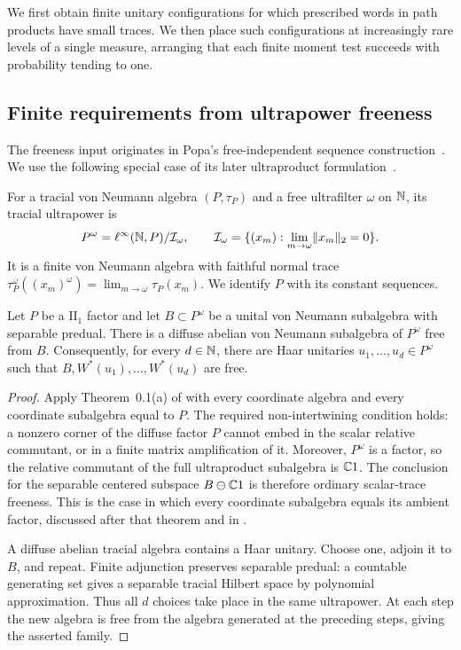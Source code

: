 We first obtain finite unitary configurations for which prescribed
words in path products have small traces.  We then place such
configurations at increasingly rare levels of a single measure,
arranging that each finite moment test succeeds with probability
tending to one.

\subsection{Finite requirements from ultrapower freeness}

The freeness input originates in Popa's free-independent sequence
construction~\cite[Lemma~1.4 and Theorem~2.1]{Popa1995}.
We use the following special case of its later ultraproduct
formulation~\cite[Theorem~0.1(a)]{Popa2014}.

For a tracial von Neumann algebra $(P,\tau_P)$ and a free ultrafilter
$\omega$ on $\mathbb N$, its tracial ultrapower is
\begin{equation}\label{eq:tracial-ultrapower}
 P^\omega=\ell^\infty(\mathbb N,P)/\mathcal I_\omega,
 \qquad
 \mathcal I_\omega
 =\{(x_m):\lim_{m\to\omega}\lVert x_m\rVert_2=0\}.
\end{equation}
It is a finite von Neumann algebra with faithful normal trace
$\tau_P^\omega((x_m)^\omega)=\lim_{m\to\omega}\tau_P(x_m)$.
We identify $P$ with its constant sequences.

\begin{lemma}\label{lem:popa-special}
Let $P$ be a $\mathrm{II}_1$ factor and let $B\subset P^\omega$ be a
unital von Neumann subalgebra with separable predual.  There is a diffuse
abelian von Neumann subalgebra of $P^\omega$ free from $B$.
Consequently, for every $d\in\mathbb N$, there are Haar unitaries
$u_1,\ldots,u_d\in P^\omega$ such that
$B,W^*(u_1),\ldots,W^*(u_d)$ are free.
\end{lemma}

\begin{proof}
Apply Theorem~0.1(a) of \cite{Popa2014} with every coordinate algebra
and every coordinate subalgebra equal to $P$.  The required
non-intertwining condition holds: a nonzero corner of the diffuse factor
$P$ cannot embed in the scalar relative commutant, or in a finite matrix
amplification of it.  Moreover, $P^\omega$ is a factor, so the relative
commutant of the full ultraproduct subalgebra is $\mathbb C1$.  The conclusion
for the separable centered subspace $B\ominus\mathbb C1$ is therefore ordinary
scalar-trace freeness. This is the case in which every coordinate
subalgebra equals its ambient factor, discussed after that theorem
and in \cite[Sections~1.5--1.6]{Popa2014}.

A diffuse abelian tracial algebra contains a Haar unitary.  Choose one,
adjoin it to $B$, and repeat.  Finite adjunction preserves separable
predual: a countable generating set gives a separable tracial Hilbert
space by polynomial approximation.  Thus all $d$ choices take place in
the same ultrapower.  At each step the new algebra is free from the
algebra generated at the preceding steps, giving the asserted family.
\end{proof}

